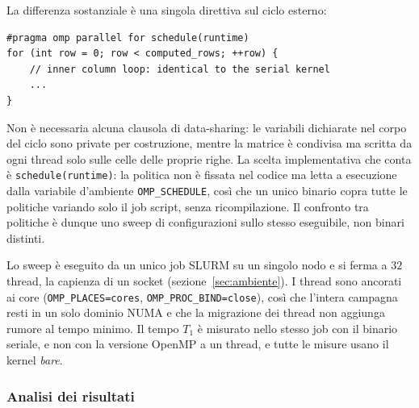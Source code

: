 La differenza sostanziale è una singola direttiva sul ciclo esterno:

\begin{verbatim}
#pragma omp parallel for schedule(runtime)
for (int row = 0; row < computed_rows; ++row) {
    // inner column loop: identical to the serial kernel
    ...
}
\end{verbatim}

Non è necessaria alcuna clausola di data-sharing: le variabili dichiarate nel
corpo del ciclo sono private per costruzione, mentre la matrice è condivisa ma
scritta da ogni thread solo sulle celle delle proprie righe. La scelta
implementativa che conta è \texttt{schedule(runtime)}: la politica non è
fissata nel codice ma letta a esecuzione dalla variabile d'ambiente
\texttt{OMP\_SCHEDULE}, così che un unico binario copra tutte le politiche
variando solo il job script, senza ricompilazione. Il confronto tra politiche è
dunque uno sweep di configurazioni sullo stesso eseguibile, non binari distinti.

Lo sweep è eseguito da un unico job SLURM su un singolo nodo e si ferma a $32$
thread, la capienza di un socket (sezione~\ref{sec:ambiente}). I thread sono
ancorati ai core (\texttt{OMP\_PLACES=cores}, \texttt{OMP\_PROC\_BIND=close}),
così che l'intera campagna resti in un solo dominio NUMA e che la migrazione dei
thread non aggiunga rumore al tempo minimo. Il tempo $T_1$ è misurato nello
stesso job con il binario seriale, e non con la versione OpenMP a un thread, e
tutte le misure usano il kernel \emph{bare}.

\subsubsection{Analisi dei risultati}
\label{sec:openmp-risultati}

